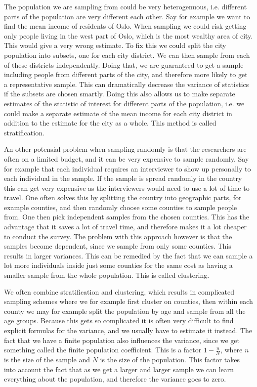 \documentclass{article}
\begin{document}
The population we are sampling from could be very heterogenuous, i.e. different
parts of the population are very different each other. Say for example we want
to find the mean income of residents of Oslo. When sampling we could risk
getting only people living in the west part of Oslo, which is the most wealthy
area of city. This would give a very wrong estimate. To fix this we could split
the city population into subsets, one for each city district. We can then sample
from each of these districts independently. Doing that, we are guaranteed to get
a sample including people from different parts of the city, and therefore
more likely to get a representative sample. This can dramatically decrease the
variance of statistics if the subsets are chosen smartly. Doing this also allows us to make
separate estimates of the statistic of interest for different parts of the
population, i.e. we could make a separate estimate of the mean income for each city
district in addition to the estimate for the city as a whole. This method is
called stratification.

An other potensial problem when sampling randomly is that the researchers are
often on a limited budget, and it can be very expensive to sample randomly. Say
for example that 
each individual requires an interviewer to show up personally to each individual
in the sample. If the sample is spread randomly in the country this can get very
expensive as the interviewers would need to use a lot of time to travel. One often solves
this by splitting the country into geographic parts, for example counties, and
then randomly choose some counties to sample people from. One then pick
independent samples from the chosen counties. This has the advantage that it
saves a lot of travel time, and therefore makes it a lot cheaper to conduct the
survey. The problem with this approach however is that the samples become
dependent, since we sample from only some counties. This results in larger
variances. This can be remedied by the fact that we can sample a lot more
individuals inside just some counties for the same
cost as having a smaller sample from the whole
population. This is called clustering.

We often combine stratification and clustering, which results in complicated
sampling schemes where we for example first cluster on counties, then within
each county we may for example split the population by age and sample from all
the age groups. Because this gets so complicated it is often very difficult to
find explicit formulas for the variance, and we usually have to estimate it
instead. 
The fact that we have a finite population also influences the variance, since we
get something called the finite population coefficient. This is a factor \(1 -
\frac{n}{N}\), where \(n\) is the size of the sample and \(N\) is the size of
the population. This factor takes into account the fact that as we get a larger
and larger sample we can learn everything about the population, and therefore
the variance goes to zero.
\end{document}
